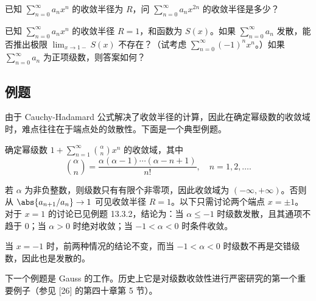 \begin{xthought}[6]
已知 $\displaystyle\sum_{n=0}^{\infty}a_nx^n$ 的收敛半径为 $R$，问 $\displaystyle\sum_{n=0}^{\infty}a_nx^{2n}$ 的收敛半径是多少？
\end{xthought}

\begin{xthought}[7]
已知 $\displaystyle\sum_{n=0}^{\infty}a_nx^n$ 的收敛半径 $R=1$，和函数为 $S(x)$。如果 $\displaystyle\sum_{n=0}^{\infty}a_n$ 发散，能否推出极限 $\displaystyle\lim_{x\to1-}S(x)$ 不存在？（试考虑 $\displaystyle\sum_{n=0}^{\infty}(-1)^nx^n$。）如果 $\displaystyle\sum_{n=0}^{\infty}a_n$ 为正项级数，则答案如何？
\end{xthought}

\subsection{例题}

由于 Cauchy-Hadamard 公式解决了收敛半径的计算，因此在确定幂级数的收敛域时，难点往往在于端点处的敛散性。下面是一个典型例题。

\begin{xexample}[14.3.1]
确定幂级数 $\displaystyle 1+\sum_{n=1}^{\infty}\binom{\alpha}{n}x^n$ 的收敛域，其中
\[
  \binom{\alpha}{n}=\frac{\alpha(\alpha-1)\cdots(\alpha-n+1)}{n!},\quad n=1,2,\ldots.
\]
\end{xexample}
\begin{xsolution}
若 $\alpha$ 为非负整数，则级数只有有限个非零项，因此收敛域为 $(-\infty,+\infty)$。否则从 $\abs{a_{n+1}/a_n}\to1$ 可见收敛半径 $R=1$。以下只需讨论两个端点 $x=\pm1$。对于 $x=1$ 的讨论已见例题 13.3.2，结论为：当 $\alpha\leqslant-1$ 时级数发散，且其通项不趋于 $0$；当 $\alpha>0$ 时绝对收敛；当 $-1<\alpha<0$ 时条件收敛。

当 $x=-1$ 时，前两种情况的结论不变，而当 $-1<\alpha<0$ 时级数不再是交错级数，因此也是发散的。
\end{xsolution}

下一个例题是 Gauss 的工作。历史上它是对级数收敛性进行严密研究的第一个重要例子（参见 [26] 的第四十章第 5 节）。

